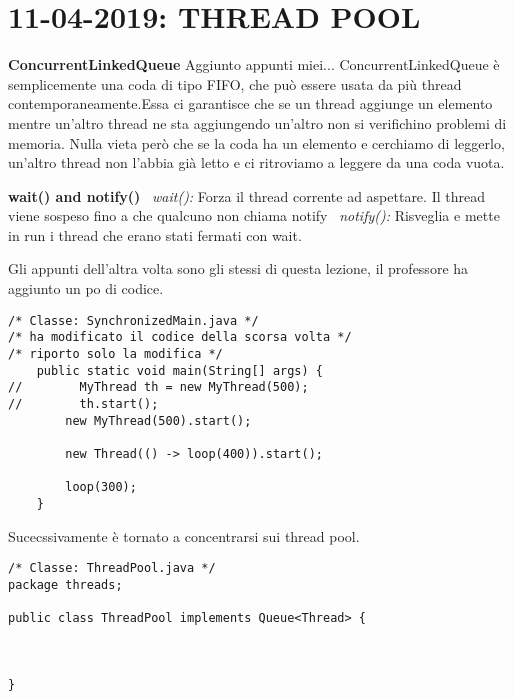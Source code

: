 

\newpage
\section{11-04-2019: THREAD POOL}
\noindent \textbf{ConcurrentLinkedQueue} \newline
Aggiunto appunti miei... ConcurrentLinkedQueue è semplicemente una coda di tipo FIFO, che può essere usata da più thread contemporaneamente.Essa ci garantisce che se un thread aggiunge un elemento mentre un'altro thread ne sta aggiungendo un'altro non si verifichino problemi di memoria. Nulla vieta però che se la coda ha un elemento e cerchiamo di leggerlo, un'altro thread non l'abbia già letto e ci ritroviamo a leggere da una coda vuota.

\noindent \textbf{wait() and notify()} \newline
\textbullet\ \textit{wait():} Forza il thread corrente ad aspettare. Il thread viene sospeso fino a che qualcuno non chiama notify \newline
\textbullet\ \textit{notify():} Risveglia e mette in run i thread che erano stati fermati con wait.


\noindent Gli appunti dell'altra volta sono gli stessi di questa lezione, il professore ha aggiunto un po di codice.
 


\begin{lstlisting}[basicstyle=\small,]
/* Classe: SynchronizedMain.java */
/* ha modificato il codice della scorsa volta */
/* riporto solo la modifica */
    public static void main(String[] args) {
//        MyThread th = new MyThread(500);
//        th.start();
        new MyThread(500).start();

        new Thread(() -> loop(400)).start();

        loop(300);
    }
\end{lstlisting}

\noindent Sucecssivamente è tornato a concentrarsi sui thread pool.

\begin{lstlisting}[basicstyle=\small,]
/* Classe: ThreadPool.java */
package threads;

public class ThreadPool implements Queue<Thread> {



}

\end{lstlisting}


